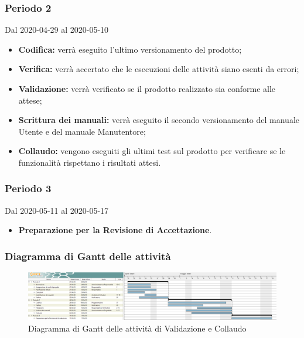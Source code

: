 \subsubsection{Periodo 2} 
Dal 2020-04-29 al 2020-05-10
\begin{itemize}
	\item \textbf{Codifica:} verrà eseguito l'ultimo versionamento del prodotto;
	\item \textbf{Verifica:} verrà accertato che le esecuzioni delle attività siano esenti da errori;
	\item \textbf{Validazione:} verrà verificato se il prodotto realizzato sia conforme alle attese;
	\item \textbf{Scrittura dei manuali:} verrà eseguito il secondo versionamento del manuale Utente e del manuale Manutentore;
	\item \textbf{Collaudo:} vengono eseguiti gli ultimi test sul prodotto per verificare se le funzionalità rispettano i risultati attesi.
\end{itemize}
\subsubsection{Periodo 3} 
Dal 2020-05-11 al 2020-05-17
\begin{itemize}
	\item \textbf{Preparazione per la Revisione di Accettazione}.
\end{itemize}


\newpage
\begin{landscape}
	\subsubsection{Diagramma di Gantt delle attività}
	\pagestyle{empty}
	\begin{figure}[h]
		
		\begin{center}	
			\includegraphics[scale=1.6]{Sezioni/DiagrammiGantt/Validazione.png}
		\end{center}
	\caption{Diagramma di Gantt delle attività di Validazione e Collaudo}	
	\end{figure}
\end{landscape}